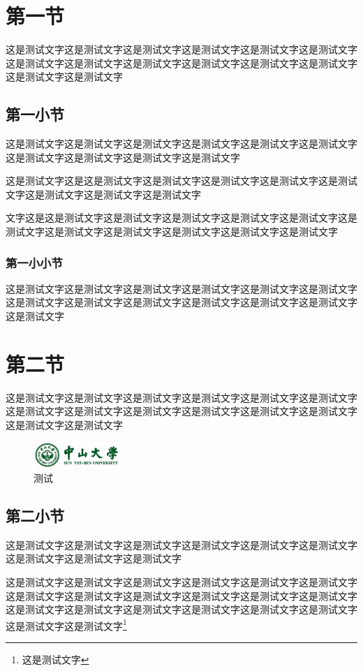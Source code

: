 \documentclass[UTF8]{ctexart}
\begin{document}
\tableofcontents\thispagestyle{empty}
\newpage
\setcounter{page}{1}
\section{第一节}
这是测试文字这是测试文字这是测试文字这是测试文字这是测试文字这是测试文字这是测试文字这是测试文字这是测试文字这是测试文字这是测试文字这是测试文字这是测试文字这是测试文字
\subsection{第一小节}
这是测试文字这是测试文字这是测试文字这是测试文字这是测试文字这是测试文字这是测试文字这是测试文字这是测试文字这是测试文字
\par 这是测试文字这是这是测试文字这是测试文字这是测试文字这是测试文字这是测试文字这是测试文字这是测试文字这是测试文字
\par 文字这是这是测试文字这是测试文字这是测试文字这是测试文字这是测试文字这是测试文字这是测试文字这是测试文字这是测试文字这是测试文字这是测试文字
\subsubsection{第一小小节}
这是测试文字这是测试文字这是测试文字这是测试文字这是测试文字这是测试文字这是测试文字这是测试文字这是测试文字这是测试文字这是测试文字这是测试文字这是测试文字
\section{第二节}
这是测试文字这是测试文字这是测试文字这是测试文字这是测试文字这是测试文字这是测试文字这是测试文字这是测试文字这是测试文字这是测试文字这是测试文字这是测试文字这是测试文字
\begin{figure}[htbp]
	\centering
	\includegraphics [width=0.3\textwidth]{logo.png}
	\caption{测试}
\end{figure}
\subsection{第二小节}
\par 这是测试文字这是测试文字这是测试文字这是测试文字这是测试文字这是测试文字这是测试文字这是测试文字这是测试文字
\par 这是测试文字这是测试文字这是测试文字这是测试文字这是测试文字这是测试文字这是测试文字这是测试文字这是测试文字这是测试文字这是测试文字这是测试文字这是测试文字这是测试文字这是测试文字这是测试文字这是测试文字这是测试文字这是测试文字这是测试文字\footnote{这是测试文字}
\end{document}
